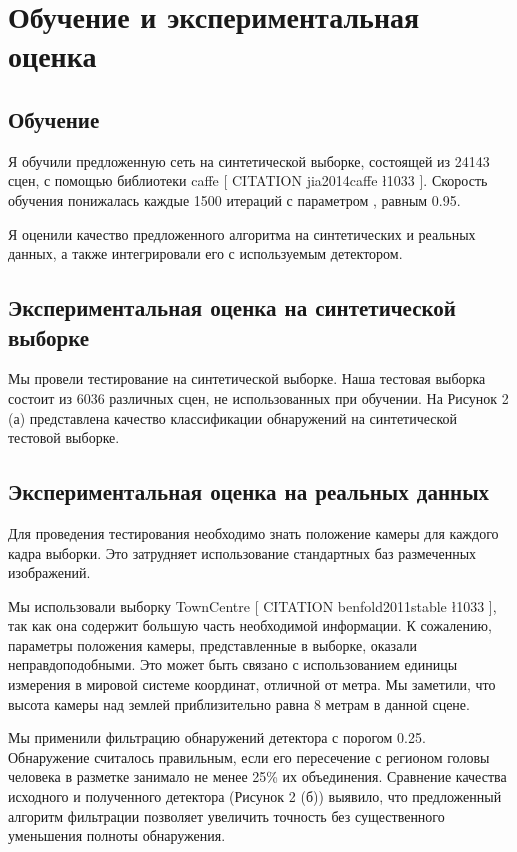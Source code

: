 \section{Обучение и экспериментальная оценка}

\subsection{Обучение}

Я обучили предложенную сеть на синтетической выборке, состоящей из 24143 сцен, с помощью библиотеки caffe [ CITATION jia2014caffe \l 1033 ]. Скорость обучения понижалась каждые 1500 итераций с параметром , равным 0.95.

Я оценили качество предложенного алгоритма на синтетических и реальных данных, а также интегрировали его с используемым детектором.

\subsection{Экспериментальная оценка на синтетической выборке}

Мы провели тестирование на синтетической выборке. Наша тестовая выборка состоит из 6036 различных сцен, не использованных при обучении. На Рисунок 2 (а) представлена качество классификации обнаружений на синтетической тестовой выборке. 

\subsection{Экспериментальная оценка на реальных данных}

Для проведения тестирования необходимо знать положение камеры для каждого кадра выборки. Это затрудняет использование стандартных баз размеченных изображений.

Мы использовали выборку TownCentre [ CITATION benfold2011stable \l 1033 ], так как она содержит большую часть необходимой информации. К сожалению, параметры положения камеры, представленные в выборке, оказали неправдоподобными. Это может быть связано с использованием единицы измерения в мировой системе координат, отличной от метра. Мы заметили, что высота камеры над землей приблизительно равна 8 метрам в данной сцене.

Мы применили фильтрацию обнаружений детектора с порогом 0.25. Обнаружение считалось правильным, если его пересечение с регионом головы человека в разметке занимало не менее 25\% их объединения. Сравнение качества исходного и полученного детектора (Рисунок 2 (б)) выявило, что предложенный алгоритм фильтрации позволяет увеличить точность без существенного уменьшения полноты обнаружения.

